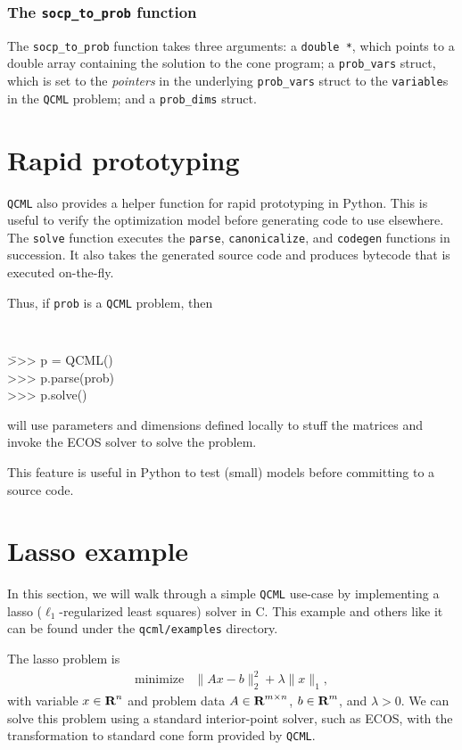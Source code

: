 \documentclass[11pt]{article}
\def\qcml{\texttt{QCML}\xspace}
\newcommand{\reals}{{\mbox{\bf R}}}
\begin{document}
\subsubsection{The {\tt socp\_to\_prob} function}
The {\tt socp\_to\_prob} function takes three arguments: a {\tt double *}, which
points to a double array containing the solution to the cone program; 
a {\tt prob\_vars} struct, which is set to
the \emph{pointers} in the underlying {\tt prob\_vars} struct to the 
{\tt variable}s in the \qcml problem; and a {\tt prob\_dims} struct.


\section{Rapid prototyping}
\qcml also provides a helper function for rapid prototyping in Python. This
is useful to verify the optimization model before generating code to use
elsewhere. The {\tt solve} function executes the {\tt parse}, {\tt canonicalize},
and {\tt codegen} functions in succession. It also takes the generated source
code and produces bytecode that is executed on-the-fly.

Thus, if {\tt prob} is a \qcml problem, then
{\tt
\begin{tabbing}
  \qquad \= >>> p = QCML() \\
  \> >>> p.parse(prob) \\
  \> >>> p.solve()
\end{tabbing}
}
\noindent 
will use parameters and dimensions defined locally to stuff the matrices and
invoke the ECOS solver to solve the problem.

This feature is useful in Python to test (small) models before committing to 
a source code.

\section{Lasso example}
In this section, we will walk through a simple \qcml use-case by implementing
a lasso ($\ell_1$-regularized least squares) solver in C. This example
and others like it can be found under the {\tt qcml/examples} directory.

The lasso problem is
\[
\begin{array}{ll}
  \mbox{minimize} & \|Ax - b\|_2^2 + \lambda \|x\|_1,
\end{array}
\]
with variable $x \in \reals^n$ and problem data $A\in\reals^{m\times n}$, 
$b \in \reals^m$, and $\lambda > 0$. We can solve this problem using a
standard interior-point solver, such as ECOS, with the transformation
to standard cone form provided by \qcml.
\end{document}
